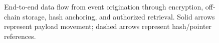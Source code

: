 \documentclass[AMA,LATO1COL]{WileyNJD-v2}
\begin{document}
%
%
%
%
%
%


\begin{figure}[!ht]
\centering
{}
\caption{End-to-end data flow from event origination through encryption, off-chain storage, hash anchoring, and authorized retrieval. Solid arrows represent payload movement; dashed arrows represent hash/pointer references.}\label{fig:web3}
\end{figure}
\end{document}
